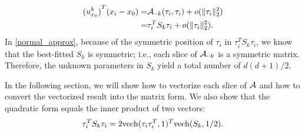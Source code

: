 \documentclass{article}
\theoremstyle{remark}
\begin{document}
\begin{equation}\label{normal_approx}
\begin{aligned}
 {(u^k_{x_0})}^T (x_i -x_0) 
=&{\cal A}_{\cdot\cdot k}(\tau_i,\tau_i) +  o(\|\tau_i\|_2^2)\\
=&\tau_i^T S_{k}\tau_i + o(\|\tau_i\|_2^2).
\end{aligned}
\end{equation}
In \eqref{normal_approx}, because of the symmetric position of $\tau_i$ in $\tau_i^T S_{k}\tau_i$, we know that the best-fitted $S_k$ is symmetric; i.e., each slice of ${\cal A}_{\cdot\cdot k}$ is a symmetric matrix. Therefore, the unknown parameters in $S_k$ yield a total number of ${d(d+1)}/{2}$. 


In the following section, we will show how to vectorize each slice of $\cal A$ and  how to convert the vectorized result into the matrix form. We also show that the quadratic form equals the inner product of two vectors:
\[
\tau_i^T S_{k}\tau_i  = 2{\rm vech}(\tau_i\tau_i^T,1)^T {\rm vech}(S_k,1/2).
\]
\end{document}
